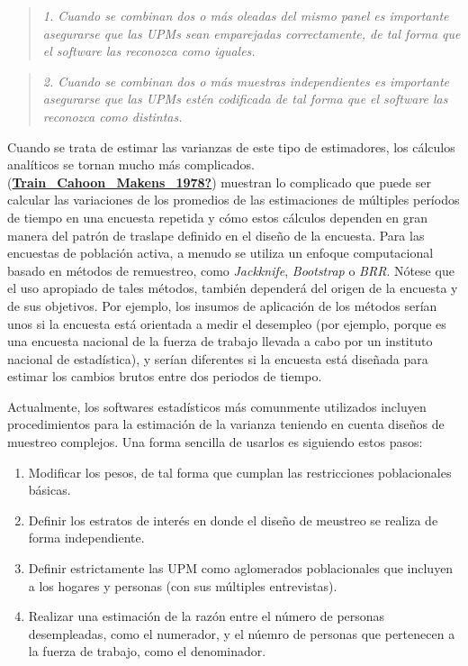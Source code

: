\documentclass[
  12pt,
  spanish,
]{book}
\providecommand{\tightlist}{%
  \setlength{\itemsep}{0pt}\setlength{\parskip}{0pt}}
\begin{document}
\begin{quote}
\emph{1. Cuando se combinan dos o más oleadas del mismo panel es importante asegurarse que las UPMs sean emparejadas correctamente, de tal forma que el software las reconozca como iguales.}
\end{quote}

\begin{quote}
\emph{2. Cuando se combinan dos o más muestras independientes es importante asegurarse que las UPMs estén codificada de tal forma que el software las reconozca como distintas.}
\end{quote}

Cuando se trata de estimar las varianzas de este tipo de estimadores, los cálculos analíticos se tornan mucho más complicados. (\protect\hyperlink{ref-Train_Cahoon_Makens_1978}{\textbf{Train\_Cahoon\_Makens\_1978?}}) muestran lo complicado que puede ser calcular las variaciones de los promedios de las estimaciones de múltiples períodos de tiempo en una encuesta repetida y cómo estos cálculos dependen en gran manera del patrón de traslape definido en el diseño de la encuesta. Para las encuestas de población activa, a menudo se utiliza un enfoque computacional basado en métodos de remuestreo, como \emph{Jackknife}, \emph{Bootstrap} o \emph{BRR}. Nótese que el uso apropiado de tales métodos, también dependerá del origen de la encuesta y de sus objetivos. Por ejemplo, los insumos de aplicación de los métodos serían unos si la encuesta está orientada a medir el desempleo (por ejemplo, porque es una encuesta nacional de la fuerza de trabajo llevada a cabo por un instituto nacional de estadística), y serían diferentes si la encuesta está diseñada para estimar los cambios brutos entre dos periodos de tiempo.

Actualmente, los softwares estadísticos más comunmente utilizados incluyen procedimientos para la estimación de la varianza teniendo en cuenta diseños de muestreo complejos. Una forma sencilla de usarlos es siguiendo estos pasos:

\begin{enumerate}
\def\labelenumi{\arabic{enumi}.}
\tightlist
\item
  Modificar los pesos, de tal forma que cumplan las restricciones poblacionales básicas.
\item
  Definir los estratos de interés en donde el diseño de meustreo se realiza de forma independiente.
\item
  Definir estrictamente las UPM como aglomerados poblacionales que incluyen a los hogares y personas (con sus múltiples entrevistas).
\item
  Realizar una estimación de la razón entre el número de personas desempleadas, como el numerador, y el núemro de personas que pertenecen a la fuerza de trabajo, como el denominador.
\end{enumerate}
\end{document}
